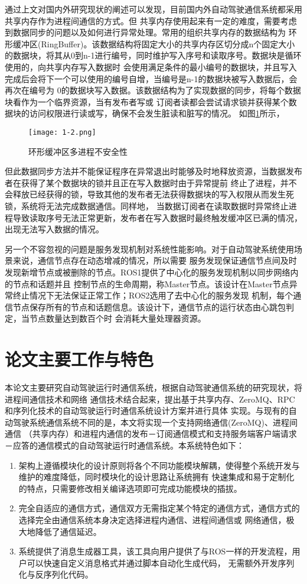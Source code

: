 通过上文对国内外研究现状的阐述可以发现，目前国内外自动驾驶通信系统都采用共享内存作为进程间通信的方式。但
共享内存使用起来有一定的难度，需要考虑到数据同步的问题以及如何进行异常处理。常用的组织共享内存的数据结构为
环形缓冲区(RingBuffer)。该数据结构将固定大小的共享内存区切分成n个固定大小的数据块，将其从0到n-1进行编号，同时维护写入序号和读取序号。数据块是循环使用的，向共享内存写入数据时
会使用满足条件的最小编号的数据块，并且写入完成后会将下一个可以使用的编号自增，当编号是n-1的数据块被写入数据后，会再次在编号为
0的数据块写入数据。该数据结构为了实现数据的同步，将每个数据块看作为一个临界资源，当有发布者写或
订阅者读都会尝试请求锁并获得某个数据块的访问权限进行读或写，确保不会发生脏读和脏写的情况。
如图\ref{ringbuffer}\cite{9235068}所示，
\begin{figure}[htb]
  \centering
  \texttt{[image: 1-2.png]}
  \caption{环形缓冲区多进程不安全性}
  \label{ringbuffer}
\end{figure}
但此数据同步方法并不能保证程序在异常退出时能够及时地释放资源，当数据发布者在获得了某个数据块的锁并且正在写入数据时由于异常提前
终止了进程，并不会释放已经获得的锁，导致其他的发布者无法获得数据块的写入权限从而发生死锁，系统将无法完成数据通信。同样地，
当数据订阅者在读取数据时异常终止进程导致读取序号无法正常更新，发布者在写入数据时最终触发缓冲区已满的情况，出现无法写入数据的情况。

另一个不容忽视的问题是服务发现机制对系统性能影响。对于自动驾驶系统使用场景来说，通信节点存在动态增减的情况，所以需要
服务发现保证通信节点间及时发现新增节点或被删除的节点。ROS1提供了中心化的服务发现机制以同步网络内的节点和话题并且
控制节点的生命周期，称Master节点。该设计在Master节点异常终止情况下无法保证正常工作；ROS2选用了去中心化的服务发现
机制，每个通信节点保存所有的节点和话题信息。该设计下，通信节点的运行状态由心跳包判定，当节点数量达到数百个时
会消耗大量处理器资源\cite{9355690}。


\section{论文主要工作与特色}
本论文主要研究自动驾驶运行时通信系统，根据自动驾驶通信系统的研究现状，将进程间通信技术和网络
通信技术结合起来，提出基于共享内存、ZeroMQ、RPC和序列化技术的自动驾驶运行时通信系统设计方案并进行具体
实现。与现有的自动驾驶系统通信系统不同的是，本文将实现一个支持网络通信(ZeroMQ)、进程间通信
（共享内存）和进程内通信的发布－订阅通信模式和支持服务端客户端请求－应答的通信模式的自动驾驶运行时通信系统。本系统特色如下：
\begin{enumerate}
  \item 架构上遵循模块化的设计原则将各个不同功能模块解耦，使得整个系统开发与维护的难度降低，同时模块化的设计思路让系统拥有
  快速集成和易于定制化的特点，只需要修改相关编译选项即可完成功能模块的插拔。
  \item 完全自适应的通信方式，通信双方无需指定某个特定的通信方式，通信方式的选择完全由通信系统本身决定选择进程内通信、进程间通信或
  网络通信，极大地降低了通信延迟。
  \item 系统提供了消息生成器工具，该工具向用户提供了与ROS一样的开发流程，用户可以快速自定义消息格式并通过脚本自动化生成代码，
  无需额外开发序列化与反序列化代码。  
\end{enumerate}

